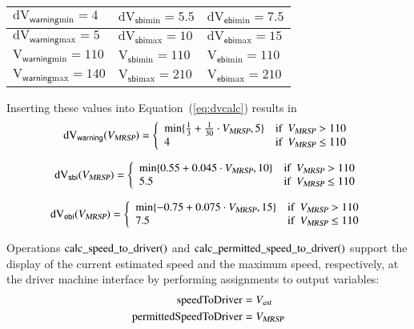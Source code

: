 \begin{center}
\bigskip
\begin{tabular}{|l|l|l|}\hline\hline
$\text{dV}_{\mathsf{warning}\text{min}} = 4$ & $\text{dV}_{\mathsf{sbi}\text{min}} = 5.5$ &  $\text{dV}_{\mathsf{ebi}\text{min}} =  7.5$
\\\hline
$\text{dV}_{\mathsf{warning}\text{max}} = 5$ & $\text{dV}_{\mathsf{sbi}\text{max}} = 10$ &  $\text{dV}_{\mathsf{ebi}\text{max}} = 15$
\\\hline\hline
$\text{V}_{\mathsf{warning}\text{min}} = 110$ & $\text{V}_{\mathsf{sbi}\text{min}} = 110$ &  $\text{V}_{\mathsf{ebi}\text{min}} =  110$
\\\hline
$\text{V}_{\mathsf{warning}\text{max}} = 140$ & $\text{V}_{\mathsf{sbi}\text{max}} = 210$ &  $\text{V}_{\mathsf{ebi}\text{max}} = 210$
\\\hline
\hline
\end{tabular}
\end{center}
Inserting these values into Equation~(\ref{eq:dvcalc}) results in
\begin{equation}\label{eq:dvw}
\dvw(\vmax) = \left\{
\begin{array}{lc}
\min\{\frac{1}{3} + \frac{1}{30}\cdot\vmax,5 \}  &    \text{if}\ \ \vmax > 110 \\
4  &  \text{if}\ \ \vmax\le  110 \\
\end{array}
\right.
\end{equation}

\begin{equation}\label{eq:dvsbi}
\text{dV}_{\mathsf{sbi}}({V_{\text{\sl MRSP}}}) = \left\{
\begin{array}{lc}
\min\{0.55+0.045\cdot{V_{\text{\sl MRSP}}},10 \}  &    \text{if}\ \ {V_{\text{\sl MRSP}}} > 110 \\
5.5  &  \text{if}\ \ {V_{\text{\sl MRSP}}}\le  110 \\
\end{array}
\right.
\end{equation}

\begin{equation}\label{eq:dvwe}
\text{dV}_{\mathsf{ebi}}({V_{\text{\sl MRSP}}}) = \left\{
\begin{array}{lc}
\min\{-0.75 + 0.075\cdot{V_{\text{\sl MRSP}}},15 \}  &    \text{if}\ \ {V_{\text{\sl MRSP}}} > 110 \\
7.5  &  \text{if}\ \ {V_{\text{\sl MRSP}}}\le  110 \\
\end{array}
\right.
\end{equation}

Operations $\text{calc\_speed\_to\_driver()}$ and $\text{calc\_permitted\_speed\_to\_driver()}$ support the display of the current estimated
speed and the maximum speed, respectively, at the driver machine interface by performing assignments to output variables:
\begin{align*}
\text{speedToDriver} &= {V_{\text{\sl est}}}\\
\text{permittedSpeedToDriver} &= {V_{\text{\sl MRSP}}}
\end{align*}


